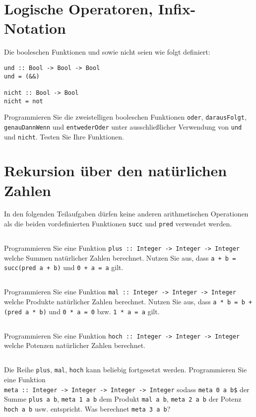 \documentclass[
  10pt,                   %
  DIV12,
  german,                 %
  oneside,                %
  parskip=half,           %
  headings=normal,        %
  captions=tableheading,  %
]{scrartcl}
\begin{document}
\section{Logische Operatoren, Infix-Notation}
Die booleschen Funktionen und sowie nicht seien wie folgt definiert:

\begin{lstlisting}
und :: Bool -> Bool -> Bool
und = (&&)

nicht :: Bool -> Bool
nicht = not
\end{lstlisting}

Programmieren Sie die zweistelligen booleschen Funktionen \lstinline|oder|, \lstinline|darausFolgt|, \lstinline|genauDannWenn| und \lstinline|entwederOder| unter ausschließlicher Verwendung von \lstinline|und|
und \lstinline|nicht|. Testen Sie Ihre Funktionen.

\section{Rekursion über den natürlichen Zahlen}
In den folgenden Teilaufgaben dürfen keine anderen arithmetischen Operationen als die beiden vordefinierten Funktionen \lstinline|succ| und \lstinline|pred| verwendet werden.
\subsection{}
Programmieren Sie eine Funktion \lstinline|plus :: Integer -> Integer -> Integer| welche Summen natürlicher Zahlen berechnet. Nutzen Sie aus, dass \lstinline|a + b = succ(pred a + b)| und \lstinline|0 + a = a| gilt.
\subsection{}
Programmieren Sie eine Funktion \lstinline|mal :: Integer -> Integer -> Integer| welche Produkte natürlicher Zahlen berechnet. Nutzen Sie aus, dass \lstinline|a * b = b + (pred a * b)| und \lstinline|0 * a = 0| bzw. \lstinline|1 * a = a| gilt.
\subsection{}
Programmieren Sie eine Funktion \lstinline|hoch :: Integer -> Integer -> Integer| welche Potenzen natürlicher Zahlen berechnet. 
\subsection{}
Die Reihe \lstinline|plus|, \lstinline|mal|, \lstinline|hoch| kann beliebig fortgesetzt werden. Programmieren Sie eine Funktion \\\lstinline|meta :: Integer -> Integer -> Integer -> Integer| sodass \lstinline|meta 0 a b$| der Summe \lstinline|plus a b|, \lstinline|meta 1 a b| dem Produkt \lstinline|mal a b|, \lstinline|meta 2 a b| der Potenz \lstinline|hoch a b| usw. entspricht. Was berechnet \lstinline|meta 3 a b|?
\newpage
\end{document}
